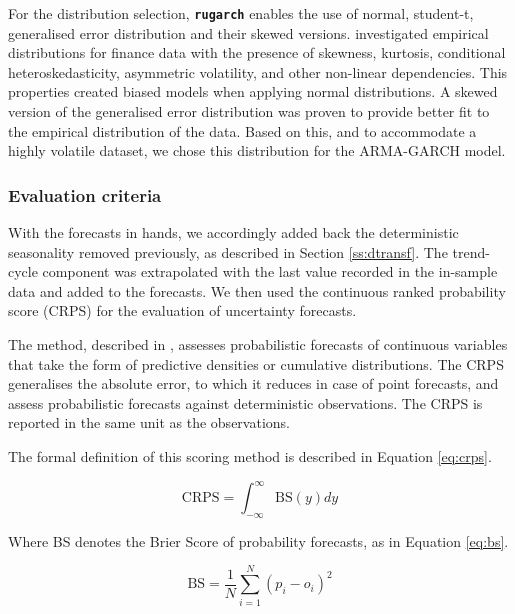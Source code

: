 \documentclass[preprint,3p,12pt,authoryear]{elsarticle}
\begin{document}
For the distribution selection, \texttt{\textbf{rugarch}} enables the use of normal, student-t, generalised error distribution and their skewed versions.
\citet{theodossiou2015skewed} investigated empirical distributions for finance data with the presence of skewness, kurtosis, conditional heteroskedasticity, asymmetric volatility, and other non-linear dependencies.
This properties created biased models when applying normal distributions.
A skewed version of the generalised error distribution was proven to provide better fit to the empirical distribution of the data. Based on this, and to accommodate a highly volatile dataset, we chose this distribution for the ARMA-GARCH model.

\subsubsection{Evaluation criteria}
\label{sss:eval}
With the forecasts in hands, we accordingly added back the deterministic seasonality removed previously, as described in Section \ref{ss:dtransf}.
The trend-cycle component was extrapolated with the last value recorded in the in-sample data and added to the forecasts.
We then used the continuous ranked probability score (CRPS) for the evaluation of uncertainty forecasts.

The method, described in \citet{GBR2007crps}, assesses probabilistic forecasts of continuous variables that take the form of predictive densities or cumulative distributions.
The CRPS generalises the absolute error, to which it reduces in case of point forecasts, and assess probabilistic forecasts against deterministic observations.
The CRPS is reported in the same unit as the observations.

The formal definition of this scoring method is described in Equation \ref{eq:crps}.

\begin{equation}
   \text{CRPS} = \int_{-\infty}^{\infty} \text{BS}(y) dy
   \label{eq:crps}
\end{equation}

Where BS denotes the Brier Score \citep{brier1950verification} of probability forecasts, as in Equation \ref{eq:bs}.

\begin{equation}
   \text{BS} = \frac{1}{N} \sum_{i=1}^N {(p_i - o_i)}^2
   \label{eq:bs}
\end{equation}
\end{document}
